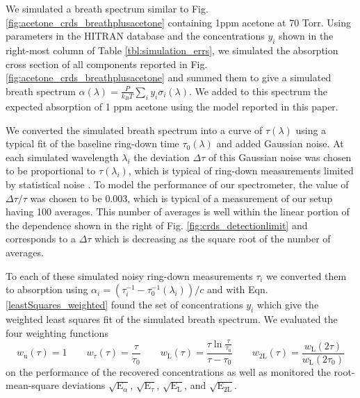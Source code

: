 \documentclass[8pt,a4paper]{report}
\begin{document}
	We simulated a breath spectrum similar to Fig. \ref{fig:acetone_crds_breathplusacetone} containing 1ppm acetone at 70 Torr. Using parameters in the HITRAN database \cite{hitran_2020} and the concentrations $y_i$ shown in the right-most column of Table \ref{tbl:simulation_errs}, we simulated the absorption cross section of all components reported in Fig. \ref{fig:acetone_crds_breathplusacetone} and summed them to give a simulated breath spectrum $\alpha(\lambda) = \frac{P}{k_B T}\sum_{i}y_i\sigma_i(\lambda)$. We added to this spectrum the expected absorption of 1 ppm acetone using the model reported in this paper.
	
	We converted the simulated breath spectrum into a curve of $\tau(\lambda)$ using a typical fit of the baseline ring-down time $\tau_0(\lambda)$ and added Gaussian noise. At each simulated wavelength $\lambda_i$ the deviation $\Delta \tau$ of this Gaussian noise was chosen to be proportional to $\tau(\lambda_i)$, which is typical of ring-down measurements limited by statistical noise \cite{vanZee_1999}. To model the performance of our spectrometer, the value of $\Delta \tau / \tau$ was chosen to be 0.003, which is typical of a measurement of our setup having 100 averages. This number of averages is well within the linear portion of the dependence shown in the right of Fig. \ref{fig:crds_detectionlimit} and corresponds to a $\Delta \tau$ which is decreasing as the square root of the number of averages.
	
	To each of these simulated noisy ring-down measurements $\tau_i$ we converted them to absorption using $\alpha_i = (\tau_i^{-1}-\tau_0^{-1}(\lambda_i))/c$ and with Eqn. \ref{leastSquares_weighted} found the set of concentrations $y_i$ which give the weighted least squares fit of the simulated breath spectrum. We evaluated the four weighting functions
	\begin{equation*}
		w_\mathrm{u}(\tau) = 1 \qquad
		w_\tau(\tau) = \frac{\tau}{\tau_0} \qquad
		w_\mathrm{L}(\tau) = \frac{\tau\ln\frac{\tau}{\tau_0}}{\tau-\tau_0} \qquad
		w_\mathrm{2L}(\tau) = \frac{w_\mathrm{L}(2\tau)}{w_\mathrm{L}(2\tau_0)}
	\end{equation*}
	on the performance of the recovered concentrations as well as monitored the root-mean-square deviations $\sqrt{\mathrm{E}_{\alpha}}$, $\sqrt{\mathrm{E}_{\tau}}$, $\sqrt{\mathrm{E}_{\mathrm{L}}}$, and $\sqrt{\mathrm{E}_{\mathrm{2L}}}$.
	
\end{document}
